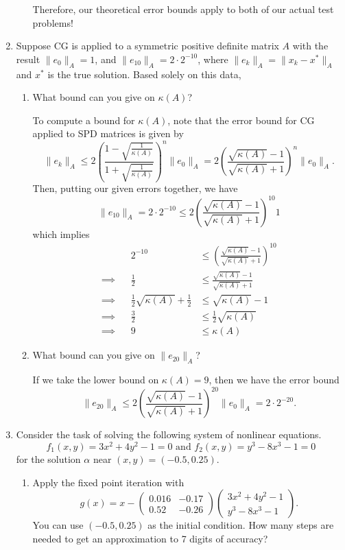 \documentclass[a4paper,12pt]{article}
\newcommand{\norm}[1]{\lVert #1 \rVert}
\newcommand{\pmat}[1]{\begin{pmatrix} #1 \end{pmatrix}}
\begin{document}
\begin{enumerate}[label = \arabic*)]
\begin{enumerate}[label = (\alph*)]
		Therefore, our theoretical error bounds apply to both of our actual test problems!
	\end{enumerate}

	\item Suppose CG is applied to a symmetric positive definite matrix $ A $ with the result $ \norm{e_0}_A = 1 $, and $ \norm{e_{10}}_A = 2 \cdot 2^{-10} $, where $ \norm{e_k}_A = \norm{x_k - x^*}_A $ and $ x^* $ is the true solution. Based solely on this data,
	\begin{enumerate}[label = (\alph*)]
		\item What bound can you give on $ \kappa(A) $?
		
		To compute a bound for $ \kappa(A) $, note that the error bound for CG applied to SPD matrices is given by
		\[
			\norm{e_k}_A \leq 2 \left(\frac{1 - \sqrt{\frac{1}{\kappa(A)}}}{1 + \sqrt{\frac{1}{\kappa(A)}}}\right)^n \norm{e_0}_A = 2 \left(\frac{\sqrt{\kappa(A)} - 1}{\sqrt{\kappa(A)} + 1}\right)^n \norm{e_0}_A.
		\]
		Then, putting our given errors together, we have
		\[
			\norm{e_{10}}_A = 2 \cdot 2^{-10} \leq 2 \left(\frac{\sqrt{\kappa(A)} - 1}{\sqrt{\kappa(A)} + 1}\right)^{10} 1
		\]
		which implies
		\begin{align*}
			&&2^{-10} &\leq \left(\frac{\sqrt{\kappa(A)} - 1}{\sqrt{\kappa(A)} + 1}\right)^{10} \\
			\implies && \frac{1}{2} &\leq \frac{\sqrt{\kappa(A)} - 1}{\sqrt{\kappa(A)} + 1} \\
			\implies && \frac{1}{2}\sqrt{\kappa(A)} + \frac{1}{2} & \leq \sqrt{\kappa(A)} - 1 \\
			\implies && \frac{3}{2} &\leq \frac{1}{2}\sqrt{\kappa(A)} \\
			\implies &&  9 &\leq \kappa(A)
		\end{align*}
	
		\item What bound can you give on $ \norm{e_{20}}_A $?
		
		If we take the lower bound on $ \kappa(A) = 9 $, then we have the error bound
		\[
			\norm{e_{20}}_A \leq 2 \left(\frac{\sqrt{\kappa(A)} - 1}{\sqrt{\kappa(A)} + 1}\right)^{20} \norm{e_0}_A = 2 \cdot 2^{-20}.
		\]
	\end{enumerate}

	\item Consider the task of solving the following system of nonlinear equations.
	\[
		f_1(x,y) = 3x^2 + 4y^2 - 1 = 0 \text{ and } f_2(x,y) = y^3 - 8x^3 - 1 = 0
	\]
	for the solution $ \alpha $ near $ (x,y) = (-0.5, 0.25) $.
	\begin{enumerate}[label = (\alph*)]
		\item Apply the fixed point iteration with
		\[
			g(x) = x - \pmat{0.016 & -0.17 \\ 0.52 & -0.26} \pmat{3x^2 + 4y^2 - 1 \\ y^3 - 8x^3 - 1}.
		\]
		You can use $ (-0.5, 0.25) $ as the initial condition. How many steps are needed to get an approximation to 7 digits of accuracy?
		

\end{enumerate}
\end{enumerate}
\end{document}
